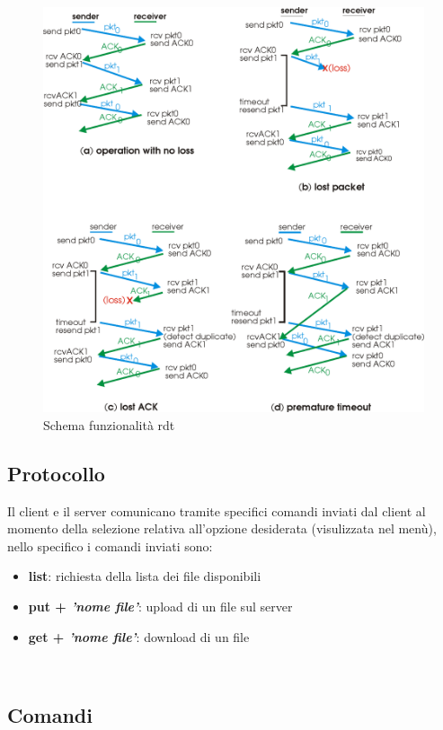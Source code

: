 \documentclass{article}
\begin{document}
\begin{figure}[!htb]
  \includegraphics[width=\linewidth]{rdtFigure.png}
  \caption{Schema funzionalità rdt}
\end{figure}

\subsection{Protocollo}

Il client e il server comunicano tramite specifici comandi inviati dal client al momento della selezione relativa all'opzione desiderata (visulizzata nel menù), nello specifico i comandi inviati sono:
\begin{itemize}
    \item \textbf{list}: richiesta della lista dei file disponibili
    \item \textbf{put + \textit{'nome file'}}: upload di un file sul server
    \item \textbf{get + \textit{'nome file'}}: download di un file
\end{itemize}

\ \\

\subsection{Comandi}
\end{document}
